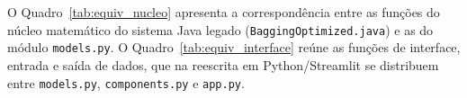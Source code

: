 
O Quadro~\ref{tab:equiv_nucleo} apresenta a correspondência entre as funções do núcleo matemático do sistema Java legado (\texttt{BaggingOptimized.java}) e as do módulo \texttt{models.py}. O Quadro~\ref{tab:equiv_interface} reúne as funções de interface, entrada e saída de dados, que na reescrita em Python/Streamlit se distribuem entre \texttt{models.py}, \texttt{components.py} e \texttt{app.py}.

